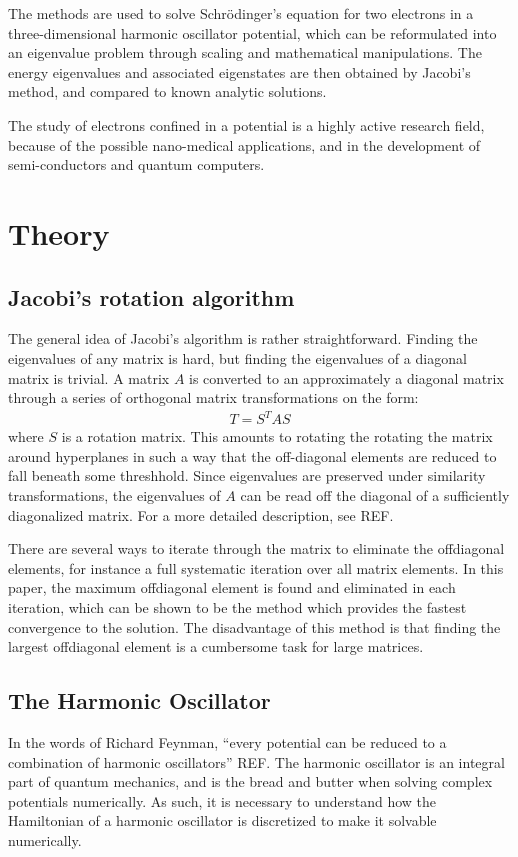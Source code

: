 \documentclass[aps,reprint]{revtex4-1}
\begin{document}
The methods are used to solve Schrödinger's equation for two electrons in a
three-dimensional harmonic oscillator potential, which can be reformulated into
an eigenvalue problem through scaling and mathematical manipulations. The
energy eigenvalues and associated eigenstates are then obtained by Jacobi's method,
and compared to known analytic solutions.

The study of electrons confined in a potential is a highly active research field,
because of the possible nano-medical applications, and in the development of semi-conductors
and quantum computers.
\section{Theory}
\label{sec:theory}
\subsection{Jacobi's rotation algorithm}
The general idea of Jacobi's algorithm is rather straightforward. Finding the
eigenvalues of any matrix is hard, but finding the eigenvalues of a diagonal
matrix is trivial. A matrix \(A\) is converted to an approximately a diagonal
matrix through a series of orthogonal matrix transformations on the form:
\begin{align*}
  T = S^T A S
\end{align*}
where $S$ is a rotation matrix. This amounts to rotating the rotating the matrix
around hyperplanes in such a way that the off-diagonal elements are reduced to
fall beneath some threshhold.
Since eigenvalues are preserved under similarity
transformations, the eigenvalues of \(A\) can be read off the diagonal of a
sufficiently diagonalized matrix. For a more detailed description, see REF.

There are several ways to iterate through the matrix to eliminate the offdiagonal
elements, for instance a full systematic iteration over all matrix elements. In this paper,
the maximum offdiagonal element is found and eliminated in each iteration, which can be shown to be
the method which provides the fastest convergence to the solution. The disadvantage of this method
is that finding the largest offdiagonal element is a cumbersome task for large matrices.
\subsection{The Harmonic Oscillator}
\label{sec:harmonic}
In the words of Richard Feynman, ``every potential can be reduced to a
combination of harmonic oscillators'' REF. The harmonic oscillator is an
integral part of quantum mechanics, and is the bread and butter when solving
complex potentials numerically. As such, it is necessary to understand how the
Hamiltonian of a harmonic oscillator is discretized to make it solvable
numerically.
\end{document}
